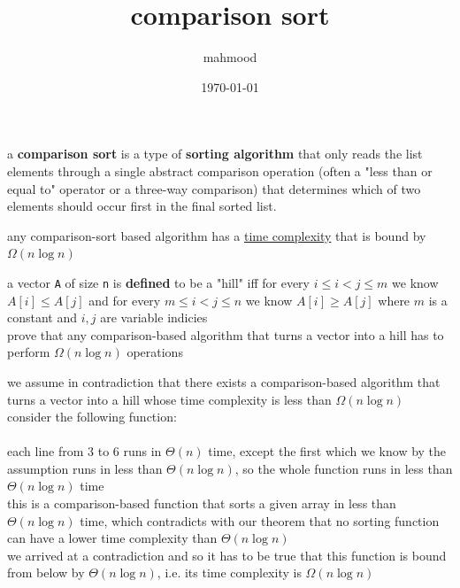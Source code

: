 \documentclass[a4paper,12pt]{article}
\author{mahmood}
\date{\today}
\title{comparison sort}
\begin{document}
\maketitle
\begin{definition}
a \textbf{comparison sort} is a type of \textbf{sorting algorithm} that only reads the list elements through a single abstract comparison operation (often a "less than or equal to" operator or a three-way comparison) that determines which of two elements should occur first in the final sorted list.\\
\begin{lemma}
any comparison-sort based algorithm has a \href{20221130014441-time_complexity.org}{time complexity} that is bound by \(\Omega(n\log n)\)\\
\begin{my_example}
a vector \texttt{A} of size \texttt{n} is \textbf{defined} to be a "hill" iff for every \(i \le i < j \le m\) we know \(A[i] \le A[j]\) and for every \(m \le i < j \le n\) we know \(A[i] \geq A[j]\) where \(m\) is a constant and \(i,j\) are variable indicies\\
prove that any comparison-based algorithm that turns a vector into a hill has to perform \(\Omega(n\log n)\) operations\\
\begin{answer}
we assume in contradiction that there exists a comparison-based algorithm that turns a vector into a hill whose time complexity is less than \(\Omega(n\log n)\)\\
consider the following function:\\
\\

each line from 3 to 6 runs in \(\Theta(n)\) time, except the first which we know by the assumption runs in less than \(\Theta(n\log n)\), so the whole function runs in less than \(\Theta(n\log n)\) time\\
this is a comparison-based function that sorts a given array in less than \(\Theta(n\log n)\) time, which contradicts with our theorem that no sorting function can have a lower time complexity than \(\Theta(n\log n)\)\\
we arrived at a contradiction and so it has to be true that this function is bound from below by \(\Theta(n\log n)\), i.e. its time complexity is \(\Omega(n\log n)\)\\
\end{answer}
\end{my_example}
\label{orgde41dd1}
\end{lemma}
\end{definition}
\end{document}

